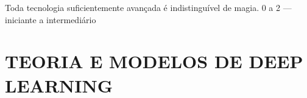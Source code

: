 \documentclass[
  12pt,
  a4paper,
  twoside,
  openright,
  chapter=TITLE,
  section=TITLE,
]{abntex2}
\begin{document}
\pretextual























\textual

  {Toda tecnologia suficientemente avançada é indistinguível de magia.}
  {0 a 2 — iniciante a intermediário}
\label{part:fundamentos}







\part{TEORIA E MODELOS DE DEEP LEARNING}
\end{document}
